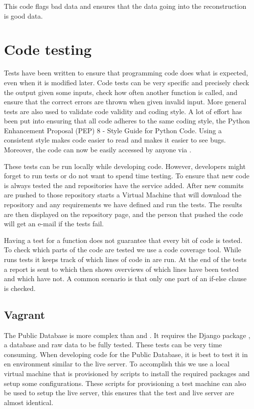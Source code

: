 This code flags bad data and ensures that the data going into the
reconstruction is good data.



\section{Code testing}

Tests have been written to ensure that programming code does what is
expected, even when it is modified later. Code tests can be very
specific and precisely check the output given some inputs, check how
often another function is called, and ensure that the correct errors are
thrown when given invalid input. More general tests are also used to
validate code validity and coding style. A lot of effort has been put
into ensuring that all \python code adheres to the same coding style,
the Python Enhancement Proposal (PEP) 8 - Style Guide for Python Code.
Using a consistent style makes code easier to read and makes it easier
to see bugs. Moreover, the code can now be easily accessed by anyone via
\github.

These tests can be run locally while developing code. However,
developers might forget to run tests or do not want to spend time
testing. To ensure that new code is always tested the \sapphire and
\jsparc repositories have the \travis service \cite{travis} added. After
new commits are pushed to those repository \travis starts a Virtual
Machine that will download the repository and any requirements we have
defined and run the tests. The results are then displayed on the
repository page, and the person that pushed the code will get an e-mail
if the tests fail.

Having a test for a function does not guarantee that every bit of code
is tested. To check which parts of the code are tested we use a code
coverage tool. While \travis runs tests it keeps track of which lines of
code in \sapphire are run. At the end of the tests a report is sent to
\coveralls \cite{coveralls} which then shows overviews of which lines
have been tested and which have not. A common scenario is that only one
part of an if-else clause is checked.


\subsection{Vagrant}

The Public Database is more complex than \sapphire and \jsparc. It
requires the Django package \cite{django}, a database and raw data to be
fully tested. These tests can be very time consuming. When developing
code for the Public Database, it is best to test it in en environment
similar to the live server. To accomplish this we use a local virtual
machine that is provisioned by scripts to install the required packages
and setup some configurations. These scripts for provisioning a test
machine can also be used to setup the live server, this ensures that the
test and live server are almost identical.


